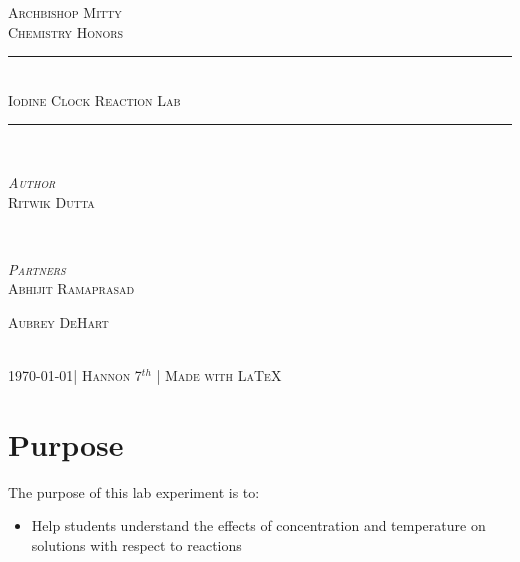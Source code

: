 \documentclass[11pt]{article}
\begin{document}
\begin{titlepage}

\newcommand{\HRule}{\rule{\linewidth}{0.5mm}} %
\newcommand{\tab}[1]{\hspace{.05\textwidth}\rlap{#1}}
\center %
 
\textsc{\Large Archbishop Mitty}\\[0.5cm] %
\textsc{\large Chemistry Honors}\\[0.5cm] %


\HRule \\[0.4cm]
\textsc{ \huge Iodine Clock Reaction Lab}\\ %
\HRule \\[1cm]
 

\begin{minipage}{0.4\textwidth}
\begin{flushleft} \large
{\textsc{\emph{Author}}}\\
\textsc{Ritwik Dutta}
\end{flushleft}
\end{minipage}
~
\begin{minipage}{0.4\textwidth}
\begin{flushright} \large
\small{\textsc{\emph{Partners}}}\\
\small{\textsc{Abhijit Ramaprasad}}

\small{\textsc{Aubrey DeHart}} %
\end{flushright}
\end{minipage}\\[4cm]

\vfill %
\large{\textsc{ \today \space | Hannon 7$^{th}$ | Made with \LaTeX}\\[3cm]}

\end{titlepage}

\section{Purpose}
The purpose of this lab experiment is to:
\begin{itemize}
	\item Help students understand the effects of concentration and temperature on solutions with respect to reactions
\end{itemize}
\end{document}
